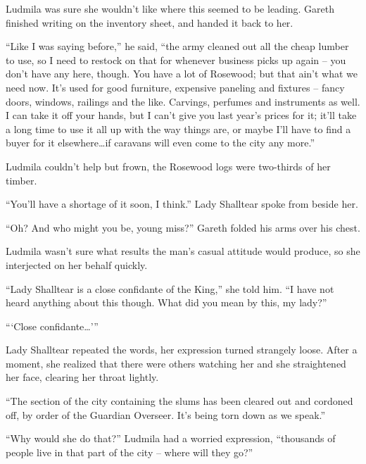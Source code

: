 Ludmila was sure she wouldn’t like where this seemed to be leading. Gareth finished writing on the inventory sheet, and handed it back to her.

 

“Like I was saying before,” he said, “the army cleaned out all the cheap lumber to use, so I need to restock on that for whenever business picks up again – you don’t have any here, though. You have a lot of Rosewood; but that ain’t what we need now. It’s used for good furniture, expensive paneling and fixtures – fancy doors, windows, railings and the like. Carvings, perfumes and instruments as well. I can take it off your hands, but I can’t give you last year’s prices for it; it’ll take a long time to use it all up with the way things are, or maybe I’ll have to find a buyer for it elsewhere…if caravans will even come to the city any more.”

 

Ludmila couldn’t help but frown, the Rosewood logs were two-thirds of her timber.

 

“You’ll have a shortage of it soon, I think.” Lady Shalltear spoke from beside her.

 

“Oh? And who might you be, young miss?” Gareth folded his arms over his chest.

 

Ludmila wasn’t sure what results the man’s casual attitude would produce, so she interjected on her behalf quickly.

 

“Lady Shalltear is a close confidante of the King,” she told him. “I have not heard anything about this though. What did you mean by this, my lady?”

 

“‘Close confidante…’”

 

Lady Shalltear repeated the words, her expression turned strangely loose. After a moment, she realized that there were others watching her and she straightened her face, clearing her throat lightly.

 

“The section of the city containing the slums has been cleared out and cordoned off, by order of the Guardian Overseer. It’s being torn down as we speak.”

 

“Why would she do that?” Ludmila had a worried expression, “thousands of people live in that part of the city – where will they go?”

